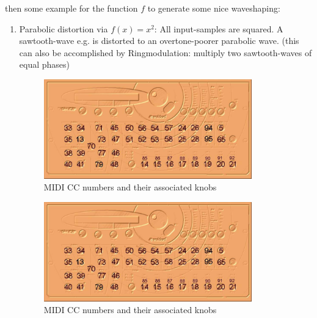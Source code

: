 \begin{example}
	then some example for the function $f$ to generate some nice waveshaping:
	\begin{enumerate}
		\item Parabolic distortion via $f(x)=x^2$: All input-samples are squared. A sawtooth-wave e.g. is distorted to an overtone-poorer parabolic wave. (this can also be accomplished by Ringmodulation: multiply two sawtooth-waves of equal phases)
		\bigskip %
		\begin{figure}[ht!]
			\centering
			\includegraphics[width=90mm]{pics/xt_midi_chart.jpg}
			\caption{MIDI CC numbers and their associated knobs}
			\label{midi_cc_interface}
		\end{figure}
		\bigskip %
		\begin{figure}[ht!]
			\centering
			\includegraphics[width=90mm]{pics/xt_midi_chart.jpg}
			\caption{MIDI CC numbers and their associated knobs}
			\label{midi_cc_interface}
		\end{figure}
		\bigskip %

\end{enumerate}
\end{example}
